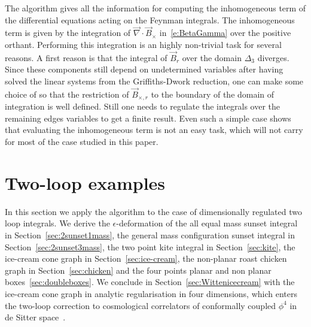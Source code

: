 \documentclass[a4paper,12pt]{article}
\numberwithin{equation}{section}
\numberwithin{figure}{section}
\begin{document}
The algorithm gives all the information for computing the
inhomogeneous term of the differential equations acting on the Feynman
integrals. The inhomogeneous term  is given by the  integration of
$\vec\nabla\cdot \vec B_\times$ in~\eqref{e:BetaGamma}  over the
positive orthant. Performing this integration is an highly non-trivial
task for several reasons. A first reason is that the integral of $\vec B_r$
over the domain $\Delta_3$ diverges.
Since these components still
depend on undetermined variables  after having solved the linear systems from the
Griffiths-Dwork reduction, one can make some choice of so that the
restriction of $\vec B_{\times,r}$ to the boundary of the domain of integration
is well defined. Still one needs to regulate the integrals over the
remaining edges variables  to get a finite
result.
Even such a simple case shows that evaluating the
inhomogeneous term is not an easy task, which will not carry for most
of the case studied in this paper. 


\section{Two-loop examples}\label{sec:twoloop}
%
In this section we apply the algorithm to  the case of dimensionally
 regulated two loop integrals. We derive the $\epsilon$-deformation of
the all equal mass sunset integral in Section~\ref{sec:2sunset1mass}, the general mass configuration
sunset integral in Section~\ref{sec:2sunset3mass}, the two point kite
integral in Section~\ref{sec:kite}, the ice-cream cone
graph in Section~\ref{sec:ice-cream}, the non-planar roast chicken
graph in Section~\ref{sec:chicken} and the four points planar
and non planar boxes~\ref{sec:doubleboxes}. We conclude in  Section~\ref{sec:Wittenicecream}
with the ice-cream cone graph in  analytic regularisation in four
dimensions, which enters the two-loop correction to cosmological
correlators of  conformally coupled $\phi^4$  in  de
 Sitter space~\cite{Chowdhury:2023arc}.
\end{document}
